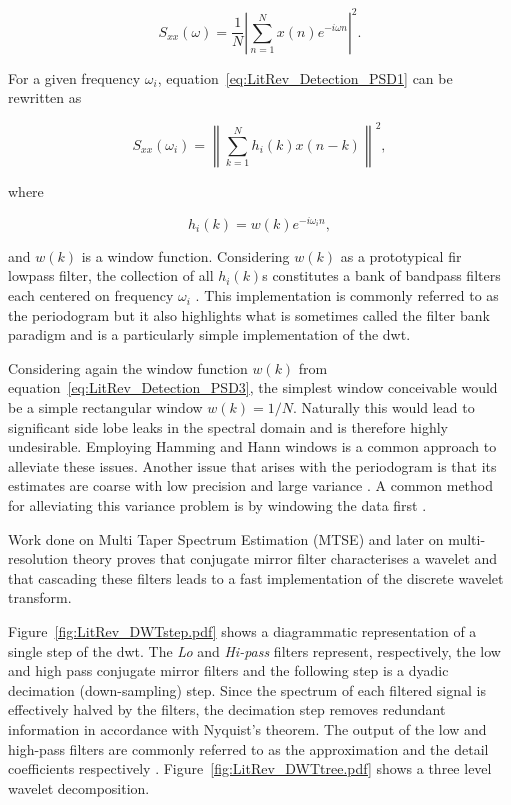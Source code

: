 \begin{equation}\label{eq:LitRev_Detection_PSD1}
S_{xx}(\omega) = \frac{1}{N} \left| \sum^{N}_{n=1} x(n) e^{-i \omega n} \right|^2.
\end{equation}

For a given frequency $\omega_i$, equation~\ref{eq:LitRev_Detection_PSD1} can be rewritten as

\begin{equation}\label{eq:LitRev_Detection_PSD2}
S_{xx}(\omega_i) = \left\| \sum^{N}_{k=1} h_i(k) x(n-k) \right\|^2,
\end{equation}

where

\begin{equation}\label{eq:LitRev_Detection_PSD3}
h_i(k) = w(k)e^{-i \omega_i n},
\end{equation}

and $w(k)$ is a window function. Considering $w(k)$ as a prototypical \DIFdelbegin {}\DIFdelend \DIFaddbegin \gls{fir} \DIFaddend lowpass filter, the collection of all $h_i(k)$s constitutes a bank of bandpass filters each centered on frequency $\omega_i$ \cite{Ariananda2013}. This implementation is commonly referred to as the periodogram but it also highlights what is sometimes called the filter bank paradigm and is a particularly simple implementation of the \DIFdelbegin {}\DIFdelend \DIFaddbegin \gls{dwt}\DIFaddend \cite{Mallat1999}.

Considering again the window function $w(k)$ from equation~\ref{eq:LitRev_Detection_PSD3}, the simplest window conceivable would be a simple rectangular window $w(k) = 1/N$. Naturally this would lead to significant side lobe leaks in the spectral domain and is therefore highly undesirable. Employing Hamming and Hann windows is a common approach to alleviate these issues. Another issue that arises with the periodogram is that its estimates are coarse with low precision and large variance \cite{Ariananda2013}. A common method for alleviating this variance problem is by windowing the data first \cite{Lim1988book}.

Work done on Multi Taper Spectrum Estimation (MTSE) \cite{Thomson1982} and later on multi-resolution theory \cite{Mallat1989}\cite{Meyer1995} proves that \DIFaddbegin {}\DIFaddend conjugate mirror filter characterises a wavelet and that cascading these filters leads to a fast implementation of the discrete wavelet transform.

Figure~\ref{fig:LitRev_DWTstep.pdf} shows a diagrammatic representation of a single step of the \DIFdelbegin {}\DIFdelend \DIFaddbegin \gls{dwt}\DIFaddend . The \emph{Lo} and \emph{Hi-pass} filters represent, respectively, the low and high pass conjugate mirror filters and the following step is a dyadic decimation (down-sampling) step. Since the spectrum of each filtered signal is effectively halved by the filters, the decimation step removes redundant information in accordance with Nyquist's theorem. The output of the low and high-pass filters are commonly referred to as the approximation and the detail coefficients respectively \cite{Mallat1999}. Figure~\ref{fig:LitRev_DWTtree.pdf} shows a three level wavelet decomposition.

